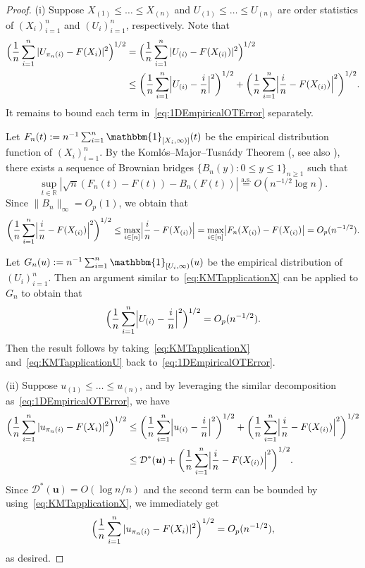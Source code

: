 \documentclass[11pt]{article}
\newcommand{\bone}{\mathbbm{1}}
\newcommand{\bs}[1]{\boldsymbol{#1}}
\begin{document}
\begin{proof}
(i) Suppose $X_{(1)} \leq \ldots \leq X_{(n)}$ and $U_{(1)} \leq \ldots \leq U_{(n)}$ are order statistics of $(X_i)_{i = 1}^n$ and $(U_i)_{i = 1}^n$, respectively. Note that
\begin{align}
\Bigl(\frac{1}{n}\sum_{i = 1}^n |U_{\pi_n(i)} - F(X_i)|^2\Bigr)^{1/2} &= \Bigl(\frac{1}{n} \sum_{i = 1}^n |U_{(i)} - F(X_{(i)})|^2 \Bigr)^{1/2} \notag \\
&\leq \biggl(\frac{1}{n} \sum_{i = 1}^n \Bigl|U_{(i)} - \frac{i}{n}\Bigr|^2 \biggr)^{1/2} + \biggl(\frac{1}{n} \sum_{i = 1}^n \Bigl|\frac{i}{n} - F(X_{(i)})\Bigr|^2\biggr)^{1/2}.  \label{eq:1DEmpiricalOTError}
\end{align}
It remains to bound each term in~\eqref{eq:1DEmpiricalOTError} separately. 

Let $F_n(t):= n^{-1}\sum_{i = 1}^n \bone_{[X_i, \infty)]}(t)$ be the empirical distribution function of $(X_i)_{i = 1}^n$. By the Koml\'os--Major--Tusn\'ady Theorem (\citet[Theorem~3]{komlos1975approximation}, see also \citet[Theorem~4.4.1]{csorgo1981strong}), there exists a sequence of Brownian bridges $\{B_n(y): 0 \leq y \leq 1\}_{n \geq 1}$ such that
\[
\sup_{t\in \mathbb{R}} |\sqrt{n}(F_n(t) - F(t)) - B_n(F(t))| \stackrel{\mathrm{a.s.}}{=} O(n^{-1/2} \log n).
\]
Since $\|B_n\|_{\infty} = O_p(1)$, we obtain that
\begin{align}
\biggl(\frac{1}{n} \sum_{i = 1}^n \Bigl|\frac{i}{n} - F(X_{(i)}) \Bigr|^2\biggr)^{1/2}
\leq \max_{i \in [n]} \Bigl|\frac{i}{n} - F(X_{(i)})\Bigr| = \max_{i \in [n]} \bigl|F_n(X_{(i)}) - F(X_{(i)})\bigr| = O_p(n^{-1/2}). \label{eq:KMTapplicationX}
\end{align}

Let $G_n(u):= n^{-1}\sum_{i = 1}^n \bone_{[U_i, \infty)} (u)$ be the empirical distribution of $(U_i)_{i = 1}^n$. Then an argument similar to~\eqref{eq:KMTapplicationX} can be applied to $G_n$ to obtain that 
\begin{align}
\Bigl(\frac{1}{n} \sum_{i = 1}^n \Bigl|U_{(i)} - \frac{i}{n}\Bigr|^2 \Bigr)^{1/2} = O_p(n^{-1/2}). \label{eq:KMTapplicationU}
\end{align}
Then the result follows by taking~\eqref{eq:KMTapplicationX} and~\eqref{eq:KMTapplicationU} back to~\eqref{eq:1DEmpiricalOTError}. 

(ii) Suppose $u_{(1)} \leq \ldots \leq u_{(n)}$, and by leveraging the similar decomposition as~\eqref{eq:1DEmpiricalOTError}, we have 
\begin{align*}
    \Bigl(\frac{1}{n}\sum_{i = 1}^n |u_{\pi_n(i)} - F(X_i)|^2\Bigr)^{1/2}  &\leq \biggl(\frac{1}{n} \sum_{i = 1}^n \Bigl|u_{(i)} - \frac{i}{n}\Bigr|^2 \biggr)^{1/2} + \biggl(\frac{1}{n} \sum_{i = 1}^n \Bigl|\frac{i}{n} - F(X_{(i)})\Bigr|^2\biggr)^{1/2}  \\ 
    & \leq \mathcal{D}^*(\bs{u}) + \biggl(\frac{1}{n} \sum_{i = 1}^n \Bigl|\frac{i}{n} - F(X_{(i)})\Bigr|^2\biggr)^{1/2}.
\end{align*}
Since $\mathcal{D}^*(\bs{u}) = O(\log n /n)$ and the second term can be bounded by using~\eqref{eq:KMTapplicationX}, we immediately get 
\[
\Bigl(\frac{1}{n}\sum_{i = 1}^n |u_{\pi_n(i)} - F(X_i)|^2\Bigr)^{1/2}  = O_p(n^{-1/2}),
\]
as desired. 
\end{proof}
\end{document}
